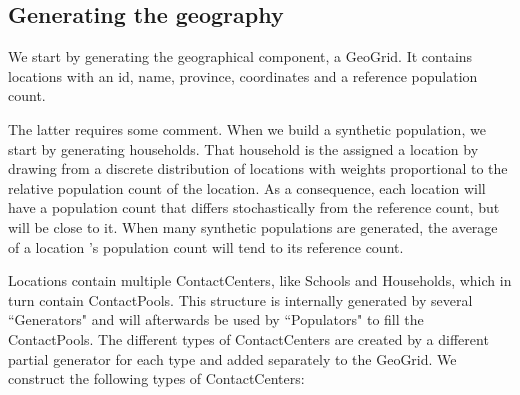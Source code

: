 \subsection{Generating the geography}
\label{subsection:gengeo}
We start by generating the geographical component, a GeoGrid.
It contains locations with an id, name, province, coordinates and a reference population count.

The latter requires some comment. When we build a synthetic population, we start by generating households. That household is the assigned a location by drawing from a discrete distribution of locations with weights proportional to the  relative population count of the location. As a consequence, each location will have a population count that differs stochastically from the reference count, but will be close to it. When many synthetic populations are generated, the average of a location 's population count will tend to its reference count.

Locations contain multiple ContactCenters, like Schools and Households, which in turn contain ContactPools.
This structure is internally generated by several ``Generators" and will afterwards be used by ``Populators" to fill the ContactPools. The different types of ContactCenters are created by a different partial generator for each type and added separately to the GeoGrid. We construct the following types of ContactCenters:

